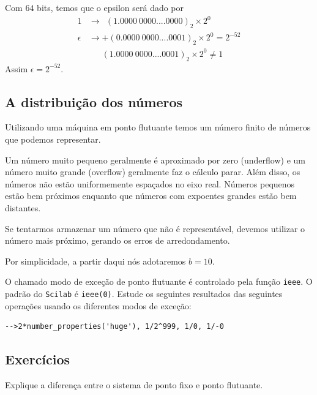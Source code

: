 \begin{ex}
  Com $64$ bits, temos que o epsilon será dado por
\begin{equation*}
  \begin{split}
  1      &\rightarrow ~~(1.0000~0000....0000)_2\times 2^{0} \\
\epsilon &\rightarrow  +(0.0000~0000....0001)_2\times 2^{0}  = 2^{-52} \\
         &      ~~~~~~~ (1.0000~0000....0001)_2\times 2^{0} \neq 1    
  \end{split}
\end{equation*}
Assim $\epsilon = 2^{-52}$.
\end{ex}



\subsection{A distribuição dos números}
Utilizando uma máquina em ponto flutuante temos um número finito de números que podemos representar.

Um número muito pequeno geralmente é aproximado por zero (underflow) e um número muito grande (overflow) geralmente faz o cálculo parar.
Além disso, os números não estão uniformemente espaçados no eixo real. Números pequenos estão bem próximos enquanto que números com expoentes grandes estão bem distantes.

Se tentarmos armazenar um número que não é representável, devemos utilizar o número mais próximo, gerando os erros de arredondamento.

Por simplicidade, a partir daqui nós adotaremos $b=10$.

\ifisscilab
\begin{obs}
  O chamado modo de exceção de ponto flutuante é controlado pela função \verb+ieee+. O padrão do \verb+Scilab+ é \verb+ieee(0)+. Estude os seguintes resultados das seguintes operações usando os diferentes modos de exceção:
\begin{verbatim}
-->2*number_properties('huge'), 1/2^999, 1/0, 1/-0
\end{verbatim}
\end{obs}
\fi

\subsection*{Exercícios}

\begin{exer} Explique a diferença entre o sistema de ponto fixo e ponto flutuante.
\end{exer}

